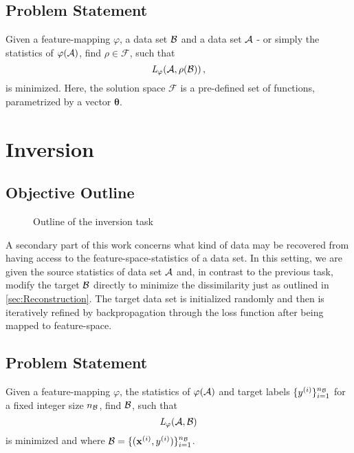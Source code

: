 \subsection{Problem Statement}
Given a feature-mapping $\varphi$, a data set $\mathcal B$ and a data set $\mathcal A$ - or simply the statistics of $\varphi(\mathcal A)$,  find $\rho \in \mathcal{F}$, such that
\[
     \textit{L} _\varphi (\mathcal A, \rho(\mathcal B)) \,,
\]
is minimized.
Here, the solution space $\mathcal F$ is a pre-defined set of functions, 
parametrized by a vector $\boldsymbol \theta$.






\section{Inversion}
\label{sec:Inversion}

\subsection{Objective Outline}

\begin{figure}[h]
    \centering
    
    \caption{Outline of the inversion task}
    \label{fig:inversion_outline}
    \centering
\end{figure}

A secondary part of this work concerns what kind of data 
may be recovered from having access to the feature-space-statistics of a data set.
In this setting, we are given the source statistics of data set $\mathcal A$
and, in contrast to the previous task, modify the target $\mathcal B$ directly to 
minimize the dissimilarity just as outlined in \cref{sec:Reconstruction}.
The target data set is initialized randomly and then is 
iteratively refined by backpropagation through the loss function 
after being mapped to feature-space.



\subsection{Problem Statement}
Given a feature-mapping $\varphi$, the statistics of $\varphi(\mathcal A)$
and target labels $\{y^{(i)}\}_{i=1}^{n_{\mathcal B}}$ for a fixed integer size $n_{\mathcal B}$,
find $\mathcal B$, such that
\[
     \textit{L} _\varphi (\mathcal A, \mathcal B)
\]
is minimized and where $\mathcal B = \{(\mathbf x^{(i)}, y^{(i)})\}_{i=1}^{n_{\mathcal B}}$.

